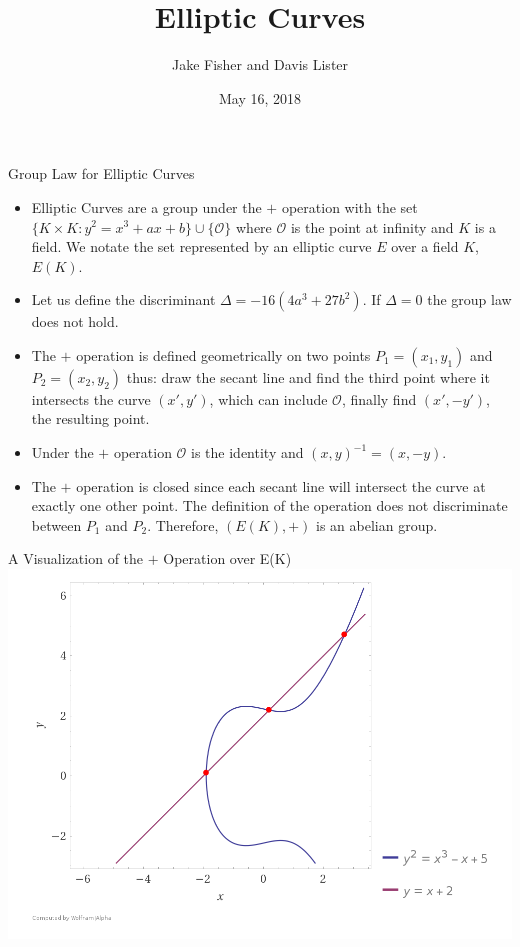 \documentclass{beamer}
\title{Elliptic Curves}
\author{Jake Fisher and Davis Lister}
\date{May 16, 2018}
\begin{document}
	
	\begin{frame}
		\titlepage
	\end{frame}
	
		\begin{frame}{Group Law for Elliptic Curves}
		\begin{itemize}
			\item Elliptic Curves are a group under the $+$ operation with the set $\lbrace K \times K: y^2=x^3+ax+b \rbrace \cup \lbrace \mathcal{O} \rbrace$ where $\mathcal{O}$ is the point at infinity and $K$ is a field. We notate the set represented by an elliptic curve $E$ over a field $K$, $E(K)$.
			\item Let us define the discriminant $\Delta = -16(4a^3+27b^2)$. If $\Delta = 0$ the group law does not hold.
			\item The $+$ operation is defined geometrically on two points $P_1=(x_1,y_1)$ and $P_2=(x_2,y_2)$ thus: draw the secant line and find the third point where it intersects the curve $(x',y')$, which can include $\mathcal{O}$, finally find $(x',-y')$, the resulting point.
			\item Under the $+$ operation $\mathcal{O}$ is the identity and $(x,y)^{-1}=(x,-y)$.
			\item The $+$ operation is closed since each secant line will intersect the curve at exactly one other point. The definition of the operation does not discriminate between $P_1$ and $P_2.$ Therefore, $(E(K),+)$ is an abelian group.
		\end{itemize}
	\end{frame}
	
	\begin{frame}{A Visualization of the $+$ Operation over E(K)}
		\includegraphics[scale=.3]{GeometricGroup.png}
	\end{frame} 
	
\end{document}
